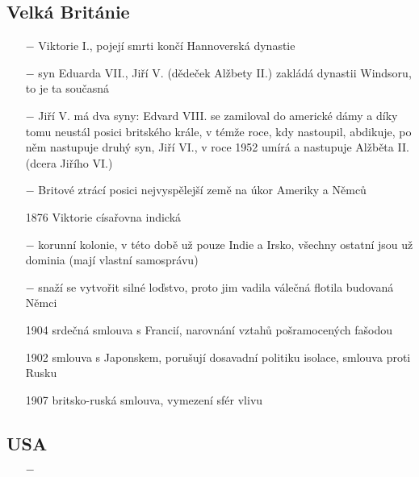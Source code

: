 \documentclass{article}
\begin{document}
\subsection*{Velká Británie}
\begin{itemize}
    \vspace{-0.5em}
    \setlength\itemsep{0.15em}
    \item[$-$] Viktorie I., pojejí smrti končí Hannoverská dynastie
    \item[$-$] syn Eduarda VII., Jiří V. (dědeček Alžbety II.) zakládá dynastii Windsoru, to je ta současná
    \item[$-$] Jiří V. má dva syny: Edvard VIII. se zamiloval do americké dámy a díky tomu neustál posici britského krále, v témže roce, kdy nastoupil, abdikuje, po něm nastupuje druhý syn, Jiří VI., v roce 1952 umírá a nastupuje Alžběta II. (dcera Jiřího VI.)
    \item[$-$] Britové ztrácí posici nejvyspělejší země na úkor Ameriky a Němců
    \item[1876] Viktorie císařovna indická
    \item[$-$] korunní kolonie, v této době už pouze Indie a Irsko, všechny ostatní jsou už dominia (mají vlastní samosprávu)
    \item[$-$] snaží se vytvořit silné loďstvo, proto jim vadila válečná flotila budovaná Němci
    \item[1904] srdečná smlouva s Francií, narovnání vztahů pošramocených fašodou
    \item[1902] smlouva s Japonskem, porušují dosavadní politiku isolace, smlouva proti Rusku
    \item[1907] britsko-ruská smlouva, vymezení sfér vlivu
\end{itemize}

\subsection*{USA}
\begin{itemize}
    \vspace{-0.5em}
    \setlength\itemsep{0.15em}
    \item[$-$] 
\end{itemize}
\end{document}
